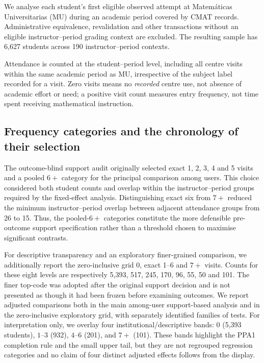 We analyse each student's first eligible observed attempt at Matem\'aticas Universitarias (MU) during an academic period covered by CMAT records. Administrative equivalence, revalidation and other transactions without an eligible instructor--period grading context are excluded. The resulting sample has 6,627 students across 190 instructor--period contexts.

Attendance is counted at the student--period level, including all centre visits within the same academic period as MU, irrespective of the subject label recorded for a visit. Zero visits means no \emph{recorded} centre use, not absence of academic effort or need; a positive visit count measures entry frequency, not time spent receiving mathematical instruction.

\subsection{Frequency categories and the chronology of their selection}

The outcome-blind support audit originally selected exact 1, 2, 3, 4 and 5 visits and a pooled $6+$ category for the principal comparison among users. This choice considered both student counts and overlap within the instructor--period groups required by the fixed-effect analysis. Distinguishing exact six from $7+$ reduced the minimum instructor--period overlap between adjacent attendance groups from 26 to 15. Thus, the pooled-$6+$ categories constitute the more defensible pre-outcome support specification rather than a threshold chosen to maximise significant contrasts.

For descriptive transparency and an exploratory finer-grained comparison, we additionally report the zero-inclusive grid 0, exact 1--6 and $7+$ visits. Counts for these eight levels are respectively 5,393, 517, 245, 170, 96, 55, 50 and 101. The finer top-code was adopted after the original support decision and is not presented as though it had been frozen before examining outcomes. We report adjusted comparisons both in the main among-user support-based analysis and in the zero-inclusive exploratory grid, with separately identified families of tests. For interpretation only, we overlay four institutional/descriptive bands: $0$ (5,393 students), $1$--$3$ (932), $4$--$6$ (201), and $7+$ (101). These bands highlight the PPA1 completion rule and the small upper tail, but they are not regrouped regression categories and no claim of four distinct adjusted effects follows from the display.

